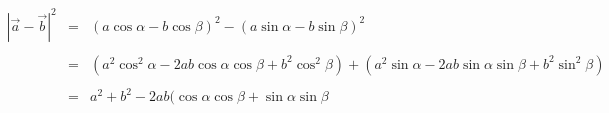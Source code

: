 \documentclass[a4paper]{article}
\begin{document}
\Large

$\begin{array}{rcl}
	| \vec{a} - \vec{b} |^2  & = & (a \cos \alpha - b \cos \beta)^2 - (a \sin \alpha - b \sin \beta)^2 \\
\\
	& = & ( a^2\cos^2\alpha - 2ab \cos\alpha\cos\beta + b^2\cos^2\beta) + (a^2\sin\alpha - 2ab\sin\alpha\sin\beta + b^2\sin^2\beta) \\
\\
	& = & a^2 + b^2 - 2ab(\cos\alpha\cos\beta+\sin\alpha\sin\beta
\end{array}
$\\\\
\end{document}
